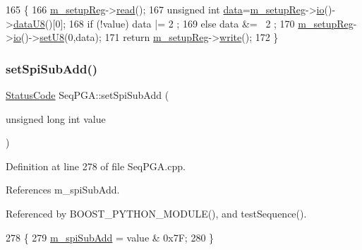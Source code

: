 \begin{DoxyCode}
165                                            \{
166   \hyperlink{classSeqPGA_a03269241e7fc26493cd0595beda334c2}{m\_setupReg}->\hyperlink{classIOobject_aa07610c11963b1db6710e3c76ceea456}{read}();
167   \textcolor{keywordtype}{unsigned} \textcolor{keywordtype}{int} \hyperlink{namespaceshell_a5ea2525995cedc3efd69ea8a7f034d1e}{data}=\hyperlink{classSeqPGA_a03269241e7fc26493cd0595beda334c2}{m\_setupReg}->\hyperlink{classIOobject_af04fb94137c3d86849f478ac5afab5d1}{io}()->\hyperlink{classIOdata_a75e9c318dbac3a39402179070943d4bc}{dataU8}()[0];
168   \textcolor{keywordflow}{if} (!value) data |=  2 ;
169   \textcolor{keywordflow}{else}        data &= ~2 ;
170   \hyperlink{classSeqPGA_a03269241e7fc26493cd0595beda334c2}{m\_setupReg}->\hyperlink{classIOobject_af04fb94137c3d86849f478ac5afab5d1}{io}()->\hyperlink{classIOdata_a6c4fb2f2af01889ada889c2b7aceb24d}{setU8}(0,data);
171   \textcolor{keywordflow}{return} \hyperlink{classSeqPGA_a03269241e7fc26493cd0595beda334c2}{m\_setupReg}->\hyperlink{classIOobject_a9f6984bc9f0fadcf800f1be2523ac744}{write}();
172 \}
\end{DoxyCode}
\mbox{\label{classSeqPGA_a5db205f213770dd3fb3fcfb8ff7981df}} 
\subsubsection{\texorpdfstring{set\+Spi\+Sub\+Add()}{setSpiSubAdd()}}
{\footnotesize\ttfamily \hyperlink{classStatusCode}{Status\+Code} Seq\+P\+G\+A\+::set\+Spi\+Sub\+Add (\begin{DoxyParamCaption}\item[{unsigned long int}]{value }\end{DoxyParamCaption})}



Definition at line 278 of file Seq\+P\+G\+A.\+cpp.



References m\+\_\+spi\+Sub\+Add.



Referenced by B\+O\+O\+S\+T\+\_\+\+P\+Y\+T\+H\+O\+N\+\_\+\+M\+O\+D\+U\+L\+E(), and test\+Sequence().


\begin{DoxyCode}
278                                                         \{
279   \hyperlink{classSeqPGA_afd5442d9b92f9b59bd553df9bd91dd87}{m\_spiSubAdd} = value & 0x7F;
280 \}
\end{DoxyCode}
\mbox{\label{classObject_a89557dbbad5bcaa02652f5d7fa35d20f}} 

